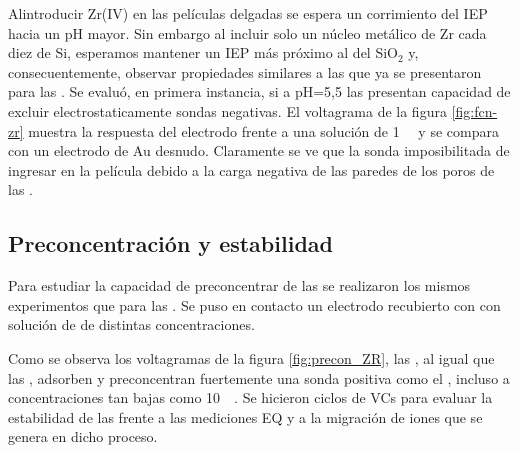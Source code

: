 	 	 Al\space introducir Zr(IV) en las películas delgadas se espera un corrimiento del IEP hacia un pH mayor\cite{Kosmulski2014}. Sin embargo al incluir solo un núcleo metálico de Zr cada diez de Si, esperamos mantener un IEP más próximo al del SiO$_2$ y, consecuentemente, observar propiedades similares a las que ya se presentaron para las \pdmF.
	 	 Se evaluó, en primera instancia, si a pH=5,5 las \pdmZ\space presentan capacidad de excluir electrostaticamente sondas negativas. El voltagrama de la figura \ref{fig:fcn-zr} muestra la respuesta del electrodo frente a una solución de \fe\space \SI{1}{\milli\Molar} y se compara con un electrodo de Au desnudo. Claramente se ve que la sonda imposibilitada de ingresar en la película debido a la carga negativa de las paredes de los poros de las \pdmZ. 
	
	 \subsection{Preconcentración y estabilidad}\label{sub:pcirc}

		 Para estudiar la capacidad de preconcentrar de las \pdmZ\space se realizaron los mismos experimentos que para las \pdmF. Se puso en contacto un electrodo recubierto con \pdmZ\space con solución de \ru\space de distintas concentraciones. 

	 	 Como se observa los voltagramas de la figura \ref{fig:precon_ZR}, las \pdmZ, al igual que las \pdmF, adsorben y preconcentran fuertemente una sonda positiva como el \ru,	incluso a concentraciones tan bajas como \SI{10}{\micro\Molar}. Se hicieron ciclos de VCs para evaluar la estabilidad de las \pdmZ\space frente a las mediciones EQ y a la migración de iones que se genera en dicho proceso. 

